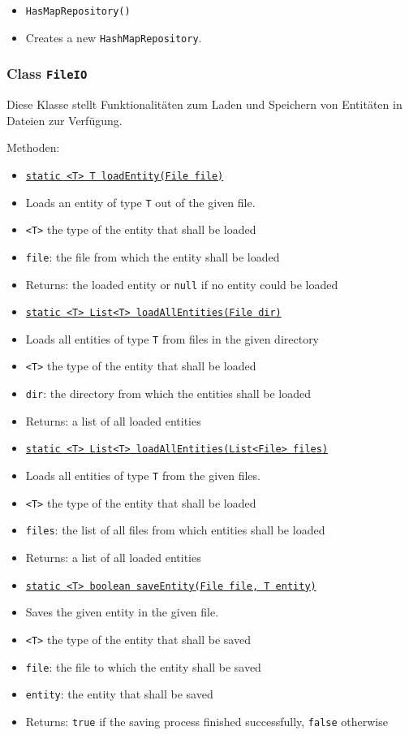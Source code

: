 \documentclass[parskip=full,11pt]{scrartcl}
\begin{document}
\begin{itemize} \itemsep -10pt
	\item \texttt{HasMapRepository()}
	\item[] Creates a new \texttt{HashMapRepository}.
\end{itemize}


\subsubsection{Class \texttt{FileIO}}

Diese Klasse stellt Funktionalitäten zum Laden und Speichern von Entitäten in Dateien zur Verfügung.

Methoden:

\begin{itemize}\itemsep -10pt
	\item \underline{\texttt{static <T> T loadEntity(File file)}}
	\item[] Loads an entity of type \texttt{T} out of the given file. 
	\item[] \texttt{<T>} the type of the entity that shall be loaded
	\item[] \texttt{file}: the file from which the entity shall be loaded
	\item[]Returns: the loaded entity or \texttt{null} if no entity could be loaded
	
	\item \underline{\texttt{static <T> List<T> loadAllEntities(File dir)}}
	\item[] Loads all entities of type \texttt{T} from files in the given directory
	\item[] \texttt{<T>} the type of the entity that shall be loaded
	\item[] \texttt{dir}: the directory from which the entities shall be loaded
	\item[]Returns: a list of all loaded entities
	
	\item \underline{\texttt{static <T> List<T> loadAllEntities(List<File> files)}}
	\item[] Loads all entities of type \texttt{T} from the given files.
	\item[] \texttt{<T>} the type of the entity that shall be loaded
	\item[] \texttt{files}: the list of all files from which entities shall be loaded
	\item[]Returns: a list of all loaded entities
	
	\item \underline{\texttt{static <T> boolean saveEntity(File file, T entity)}}
	\item[] Saves the given entity in the given file.
	\item[] \texttt{<T>} the type of the entity that shall be saved
	\item[] \texttt{file}: the file to which the entity shall  be saved
	\item[] \texttt{entity}: the entity that shall be saved
	\item[]Returns: \texttt{true} if the saving process finished successfully, \texttt{false} otherwise
\end{itemize}
\end{document}
